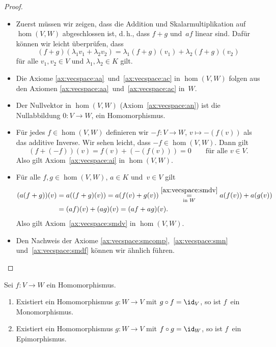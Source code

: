 \documentclass[a4paper]{article}
\begin{document}
\begin{proof}\leavevmode
    \begin{itemize}
        \item Zuerst müssen wir zeigen, dass die Addition und Skalarmultiplikation auf $\hom(V,W)$ abgeschlossen ist, d.\,h., dass $f+g$ und~$af$ linear sind. Dafür können wir leicht überprüfen, dass
        \begin{equation*}
            (f+g)(\lambda_1v_1+\lambda_2v_2) = \lambda_1(f+g)(v_1)+\lambda_2(f+g)(v_2)
        \end{equation*}
        für alle $v_1,v_2 \in V$ und $\lambda_1,\lambda_2 \in K$ gilt.
        \item Die Axiome \ref{ax:vecspace:aa}~und~\ref{ax:vecspace:ac} in $\hom(V,W)$ folgen aus den Axiomen \ref{ax:vecspace:aa}~und~\ref{ax:vecspace:ac} in~$W$.
        \item Der Nullvektor in $\hom(V,W)$ (Axiom~\ref{ax:vecspace:an}) ist die Nullabbildung $0\colon V \to W$, ein Homomorphismus.
        \item Für jedes $f \in \hom(V,W)$ definieren wir $-f\colon V \to W$, $v \mapsto -(f(v))$ als das additive Inverse. Wir sehen leicht, dass $-f \in \hom(V,W)$. Dann gilt
        \begin{equation*}
            (f+(-f))(v) = f(v)+(-(f(v))) = 0 \qquad\text{für alle } v \in V.
        \end{equation*}
        Also gilt Axiom~\ref{ax:vecspace:ai} in $\hom(V,W)$.
        \item Für alle $f,g \in \hom(V,W)$, $a \in K$ und~$v \in V$ gilt
        \begin{align*}
            (a(f+g))(v) &= a((f+g)(v)) = a(f(v)+g(v)) \underset{\text{in }W}{\overset{\ref{ax:vecspace:smdv}}{=}} a(f(v))+a(g(v)) \\
            &= (af)(v)+(ag)(v) = (af+ag)(v).
        \end{align*}
        Also gilt Axiom~\ref{ax:vecspace:smdv} in $\hom(V,W)$.
        \item Den Nachweis der Axiome \ref{ax:vecspace:smcomp},~\ref{ax:vecspace:smn} und~\ref{ax:vecspace:smdf} können wir ähnlich führen.\qedhere
    \end{itemize}
\end{proof}

\begin{lemma}\label{lem:hom:id}
    Sei $f\colon V \to W$ ein Homomorphismus.
    \begin{enumerate}
        \item Existiert ein Homomorphismus $g\colon W \to V$ mit $g\circ f = \id_V$, so ist $f$~ein Monomorphismus.
        \item Existiert ein Homomorphismus $g\colon W \to V$ mit $f\circ g = \id_W$, so ist $f$~ein Epimorphismus.
    \end{enumerate}
\end{lemma}
\end{document}
